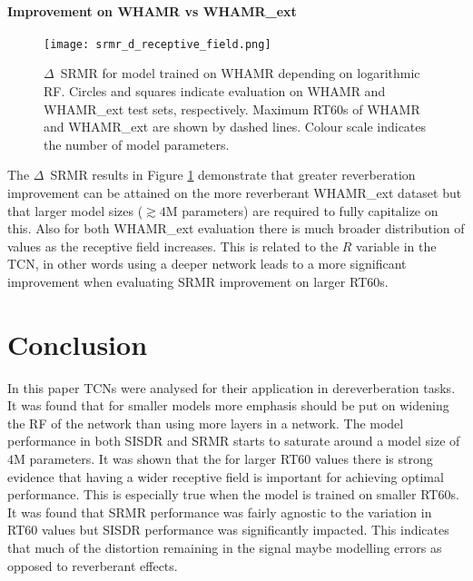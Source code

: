 \documentclass[conference,a4paper]{IEEEtran}
\begin{document}
\paragraph{Improvement on WHAMR vs WHAMR\_ext}
\begin{figure}[h]
    \centering
    \texttt{[image: srmr\_d\_receptive\_field.png]}
    \caption{$\Delta$~SRMR for model trained on WHAMR depending on logarithmic \ac{RF}. Circles and squares indicate evaluation on WHAMR and WHAMR\_ext test sets, respectively. Maximum RT60s of WHAMR and WHAMR\_ext are shown by dashed lines. Colour scale indicates the number of model parameters.}
    \label{fig:srmr_d}
\end{figure}
The $\Delta$~\ac{SRMR} results in Figure \ref{fig:srmr_d} demonstrate that greater reverberation improvement can be attained on the more reverberant WHAMR\_ext dataset but that larger model sizes ($\gtrsim4$M parameters) are required to fully capitalize on this. Also for both WHAMR\_ext evaluation there is much broader distribution of values as the receptive field increases. This is related to the $R$ variable in the TCN, in other words using a deeper network leads to a more significant improvement when evaluating \ac{SRMR} improvement on larger RT60s.
\section{Conclusion}\label{sec:6}
In this paper \ac{TCN}s were analysed for their application in dereverberation tasks.
It was found that for smaller models more emphasis should be put on widening the \ac{RF} of the network than using more layers in a network.
The model performance in both \ac{SISDR} and \ac{SRMR} starts to saturate around a model size of $4$M parameters. 
It was shown that the for larger RT60 values there is strong evidence that having a wider receptive field is important for achieving optimal performance. This is especially true when the model is trained on smaller RT60s. 
It was found that \ac{SRMR} performance was fairly agnostic to the variation in RT60 values but \ac{SISDR} performance was significantly impacted.
This indicates that much of the distortion remaining in the signal maybe modelling errors as opposed to reverberant effects.


 

\end{document}
